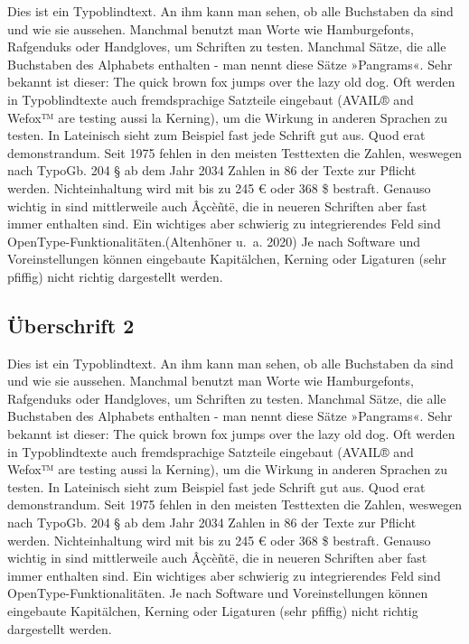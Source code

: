 \documentclass[
  letterpaper,
  DIV=11]{scrartcl}
\begin{document}
Dies ist ein Typoblindtext. An ihm kann man sehen, ob alle Buchstaben da
sind und wie sie aussehen. Manchmal benutzt man Worte wie Hamburgefonts,
Rafgenduks oder Handgloves, um Schriften zu testen. Manchmal Sätze, die
alle Buchstaben des Alphabets enthalten - man nennt diese Sätze
»Pangrams«. Sehr bekannt ist dieser: The quick brown fox jumps over the
lazy old dog. Oft werden in Typoblindtexte auch fremdsprachige Satzteile
eingebaut (AVAIL® and Wefox™ are testing aussi la Kerning), um die
Wirkung in anderen Sprachen zu testen. In Lateinisch sieht zum Beispiel
fast jede Schrift gut aus. Quod erat demonstrandum. Seit 1975 fehlen in
den meisten Testtexten die Zahlen, weswegen nach TypoGb. 204 § ab dem
Jahr 2034 Zahlen in 86 der Texte zur Pflicht werden. Nichteinhaltung
wird mit bis zu 245 € oder 368 \$ bestraft. Genauso wichtig in sind
mittlerweile auch Âçcèñtë, die in neueren Schriften aber fast immer
enthalten sind. Ein wichtiges aber schwierig zu integrierendes Feld sind
OpenType-Funktionalitäten.(Altenhöner u.~a. 2020) Je nach Software und
Voreinstellungen können eingebaute Kapitälchen, Kerning oder Ligaturen
(sehr pfiffig) nicht richtig dargestellt werden.

\subsection{Überschrift 2}\label{uxfcberschrift-2}

Dies ist ein Typoblindtext. An ihm kann man sehen, ob alle Buchstaben da
sind und wie sie aussehen. Manchmal benutzt man Worte wie Hamburgefonts,
Rafgenduks oder Handgloves, um Schriften zu testen. Manchmal Sätze, die
alle Buchstaben des Alphabets enthalten - man nennt diese Sätze
»Pangrams«. Sehr bekannt ist dieser: The quick brown fox jumps over the
lazy old dog. Oft werden in Typoblindtexte auch fremdsprachige Satzteile
eingebaut (AVAIL® and Wefox™ are testing aussi la Kerning), um die
Wirkung in anderen Sprachen zu testen. In Lateinisch sieht zum Beispiel
fast jede Schrift gut aus. Quod erat demonstrandum. Seit 1975 fehlen in
den meisten Testtexten die Zahlen, weswegen nach TypoGb. 204 § ab dem
Jahr 2034 Zahlen in 86 der Texte zur Pflicht werden. Nichteinhaltung
wird mit bis zu 245 € oder 368 \$ bestraft. Genauso wichtig in sind
mittlerweile auch Âçcèñtë, die in neueren Schriften aber fast immer
enthalten sind. Ein wichtiges aber schwierig zu integrierendes Feld sind
OpenType-Funktionalitäten. Je nach Software und Voreinstellungen können
eingebaute Kapitälchen, Kerning oder Ligaturen (sehr pfiffig) nicht
richtig dargestellt werden.
\end{document}
